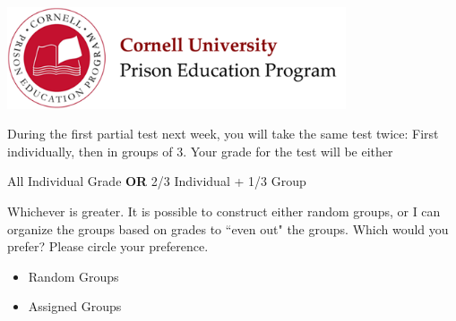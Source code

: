 \documentclass[addpoints,12pt]{exam}
\begin{document}
\footer{}{}{}


\begin{center}
\includegraphics[width=10cm]{../images/logo.png}
\end{center}

\begin{center}
\end{center}

\vspace{0.5in}

During the first partial test next week, you will take the same test twice: First individually, then in groups of 3. Your grade for the test will be either
\begin{center}
All Individual Grade \textbf{OR} 2/3 Individual + 1/3 Group
\end{center}
Whichever is greater. It is possible to construct either random groups, or I can organize the groups based on grades to ``even out" the groups. Which would you prefer? Please circle your preference.
\begin{itemize}
	\item Random Groups
	\item Assigned Groups
\end{itemize}
\end{document}
